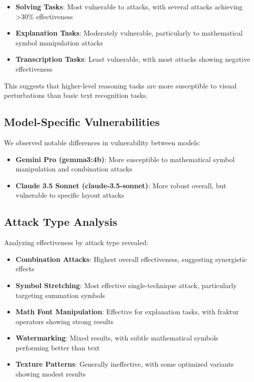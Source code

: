 \documentclass[conference]{IEEEtran}
\begin{document}
\begin{enumerate}
\begin{itemize}
    \item \textbf{Solving Tasks}: Most vulnerable to attacks, with several attacks achieving >30\% effectiveness
    \item \textbf{Explanation Tasks}: Moderately vulnerable, particularly to mathematical symbol manipulation attacks
    \item \textbf{Transcription Tasks}: Least vulnerable, with most attacks showing negative effectiveness
\end{itemize}

This suggests that higher-level reasoning tasks are more susceptible to visual perturbations than basic text recognition tasks.

\subsection{Model-Specific Vulnerabilities}
We observed notable differences in vulnerability between models:

\begin{itemize}
    \item \textbf{Gemini Pro (gemma3:4b)}: More susceptible to mathematical symbol manipulation and combination attacks
    \item \textbf{Claude 3.5 Sonnet (claude-3.5-sonnet)}: More robust overall, but vulnerable to specific layout attacks
\end{itemize}

\subsection{Attack Type Analysis}
Analyzing effectiveness by attack type revealed:

\begin{itemize}
    \item \textbf{Combination Attacks}: Highest overall effectiveness, suggesting synergistic effects
    \item \textbf{Symbol Stretching}: Most effective single-technique attack, particularly targeting summation symbols
    \item \textbf{Math Font Manipulation}: Effective for explanation tasks, with fraktur operators showing strong results
    \item \textbf{Watermarking}: Mixed results, with subtle mathematical symbols performing better than text
    \item \textbf{Texture Patterns}: Generally ineffective, with some optimized variants showing modest results
\end{itemize}


\end{enumerate}
\end{document}
